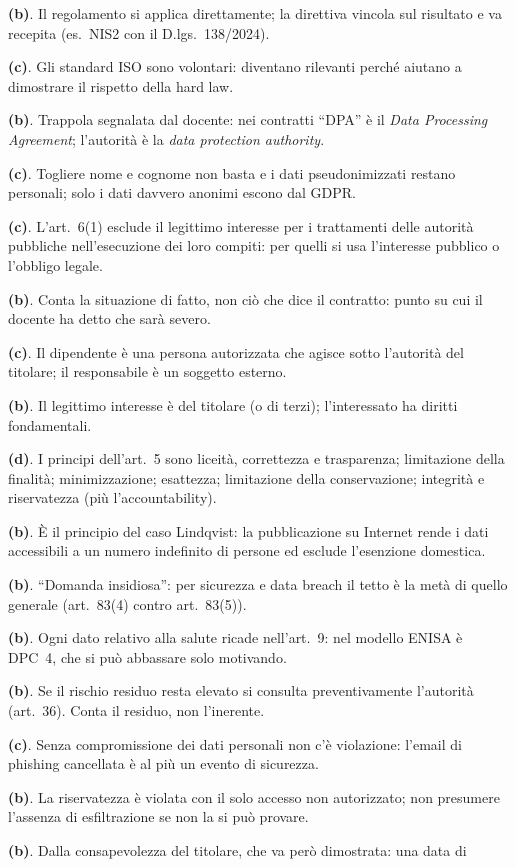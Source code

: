 \newcommand{\sol}[2]{\item[\ref{#1}.] \textbf{(#2)}.}
\begin{description}[leftmargin=2.5em,labelwidth=2em,font=\normalfont\bfseries]
  \sol{q:regolamento}{b} Il regolamento si applica direttamente; la direttiva vincola sul risultato e va
    recepita (es.\ NIS2 con il D.lgs.~138/2024).
  \sol{q:softlaw}{c} Gli standard ISO sono volontari: diventano rilevanti perché aiutano a dimostrare
    il rispetto della hard law.
  \sol{q:dpa}{b} Trappola segnalata dal docente: nei contratti ``DPA'' è il \emph{Data Processing
    Agreement}; l'autorità è la \emph{data protection authority}.
  \sol{q:anonimi}{c} Togliere nome e cognome non basta e i dati pseudonimizzati restano personali; solo
    i dati davvero anonimi escono dal GDPR.
  \sol{q:gdpr-basi}{c} L'art.~6(1) esclude il legittimo interesse per i trattamenti delle autorità
    pubbliche nell'esecuzione dei loro compiti: per quelli si usa l'interesse pubblico o l'obbligo legale.
  \sol{q:ruoli-fatto}{b} Conta la situazione di fatto, non ciò che dice il contratto: punto su cui il
    docente ha detto che sarà severo.
  \sol{q:autorizzato}{c} Il dipendente è una persona autorizzata che agisce sotto l'autorità del
    titolare; il responsabile è un soggetto esterno.
  \sol{q:legittimo}{b} Il legittimo interesse è del titolare (o di terzi); l'interessato ha diritti
    fondamentali.
  \sol{q:principi}{d} I principi dell'art.~5 sono liceità, correttezza e trasparenza; limitazione della
    finalità; minimizzazione; esattezza; limitazione della conservazione; integrità e riservatezza (più
    l'accountability).
  \sol{q:domestica}{b} È il principio del caso Lindqvist: la pubblicazione su Internet rende i dati
    accessibili a un numero indefinito di persone ed esclude l'esenzione domestica.
  \sol{q:sanzioni}{b} ``Domanda insidiosa'': per sicurezza e data breach il tetto è la metà di quello
    generale (art.~83(4) contro art.~83(5)).
  \sol{q:malattia}{b} Ogni dato relativo alla salute ricade nell'art.~9: nel modello ENISA è DPC~4,
    che si può abbassare solo motivando.
  \sol{q:dpia}{b} Se il rischio residuo resta elevato si consulta preventivamente l'autorità
    (art.~36). Conta il residuo, non l'inerente.
  \sol{q:def-breach}{c} Senza compromissione dei dati personali non c'è violazione: l'email di
    phishing cancellata è al più un evento di sicurezza.
  \sol{q:accesso}{b} La riservatezza è violata con il solo accesso non autorizzato; non presumere
    l'assenza di esfiltrazione se non la si può provare.
  \sol{q:decorrenza}{b} Dalla consapevolezza del titolare, che va però dimostrata: una data di

\end{description}
